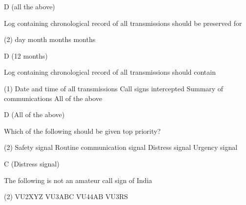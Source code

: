 \documentclass[a4paper]{article}
\begin{document}
\begin{solution}
	D (all the above)
\end{solution}

\vspace{5mm}



\begin{question}Log containing chronological record of all transmissions should be preserved for
	\begin{tasks}(2)
		 day
		 month
		 months
		 months
	\end{tasks}
\end{question}

\begin{solution}
	D (12 months)
\end{solution}

\vspace{5mm}



\begin{question}Log containing chronological record of all transmissions should contain
	\begin{tasks}(1)
		\task Date and time of all transmissions
		\task Call signs intercepted
		\task Summary of communications
		\task All of the above
	\end{tasks}
\end{question}

\begin{solution}
	D (All of the above)
\end{solution}

\vspace{5mm}



\begin{question}Which of the following should be given top priority?
	\begin{tasks}(2)
		\task Safety signal
		\task Routine communication signal
		\task Distress signal
		\task Urgency signal
	\end{tasks}
\end{question}

\begin{solution}
	C (Distress signal)
\end{solution}

\vspace{5mm}



\begin{question}The following is not an amateur call sign of India
	\begin{tasks}(2)
		\task VU2XYZ
		\task VU3ABC
		\task VU44AB
		\task VU3RS
	\end{tasks}
\end{question}
\end{document}

